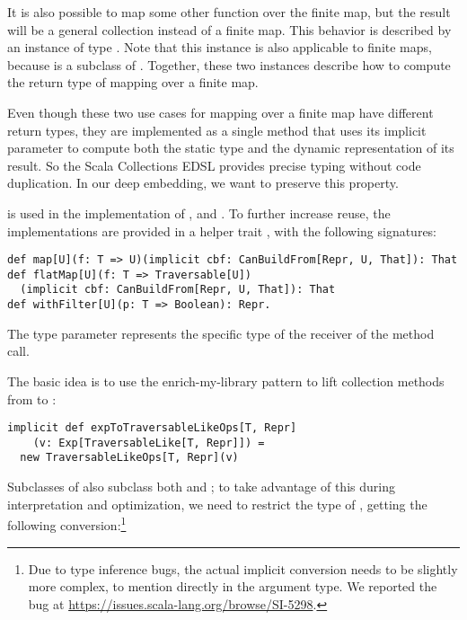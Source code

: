 It is also possible to map some other function over the finite map, but the result will be a general collection instead of a finite map. This behavior is described by an instance of type \code{CanBuildFrom[Traversable[T], U, Traversable[U]}. Note that this instance is also applicable to finite maps, because  is a subclass of . Together, these two instances describe how to compute the return type of mapping over a finite map.

Even though these two use cases for mapping over a finite map have different return types, they are implemented as a single method that uses its implicit  parameter to compute both the static type and the dynamic representation of its result. So the Scala Collections EDSL provides precise typing without code duplication. In our deep embedding, we want to preserve this property.

 is used in the implementation of ,  and . To further increase reuse, the implementations are provided in a helper trait , with the following signatures:

\begin{lstlisting}
def map[U](f: T => U)(implicit cbf: CanBuildFrom[Repr, U, That]): That
def flatMap[U](f: T => Traversable[U])
  (implicit cbf: CanBuildFrom[Repr, U, That]): That
def withFilter[U](p: T => Boolean): Repr.
\end{lstlisting}

The  type parameter represents the specific type of the receiver of the method call.

The basic idea is to use the enrich-my-library pattern to lift collection methods from  to :
\begin{lstlisting}
implicit def expToTraversableLikeOps[T, Repr]
    (v: Exp[TraversableLike[T, Repr]]) =
  new TraversableLikeOps[T, Repr](v)
\end{lstlisting}

Subclasses of  also subclass both  and ; to take advantage of this during interpretation and optimization, we need to restrict the type of , getting the following conversion:\footnote{Due to type inference bugs, the actual implicit conversion needs to be slightly more complex, to mention  directly in the argument type. We reported the bug at \url{https://issues.scala-lang.org/browse/SI-5298}.}

